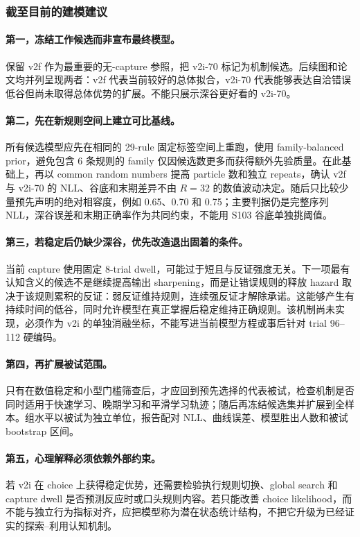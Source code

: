 \subsubsection{截至目前的建模建议}

\paragraph{第一，冻结工作候选而非宣布最终模型。}
保留 v2f 作为最重要的无-capture 参照，把 v2i-70 标记为机制候选。后续图和论文均并列呈现两者：v2f 代表当前较好的总体拟合，v2i-70 代表能够表达自洽错误低谷但尚未取得总体优势的扩展。不能只展示深谷更好看的 v2i-70。

\paragraph{第二，先在新规则空间上建立可比基线。}
所有候选模型应先在相同的 29-rule 固定标签空间上重跑，使用 family-balanced prior，避免包含 6 条规则的 family 仅因候选数更多而获得额外先验质量。在此基础上，再以 common random numbers 提高 particle 数和独立 repeats，确认 v2f 与 v2i-70 的 NLL、谷底和末期差异不由 $R=32$ 的数值波动决定。随后只比较少量预先声明的绝对相容度，例如 0.65、0.70 和 0.75；主要判据仍是完整序列 NLL，深谷误差和末期正确率作为共同约束，不能用 S103 谷底单独挑阈值。

\paragraph{第三，若稳定后仍缺少深谷，优先改造退出固着的条件。}
当前 capture 使用固定 8-trial dwell，可能过于短且与反证强度无关。下一项最有认知含义的候选不是继续提高输出 sharpening，而是让错误规则的释放 hazard 取决于该规则累积的反证：弱反证维持规则，连续强反证才解除承诺。这能够产生有持续时间的低谷，同时允许模型在真正掌握后稳定维持正确规则。该机制尚未实现，必须作为 v2i 的单独消融坐标，不能写进当前模型方程或事后针对 trial 96--112 硬编码。

\paragraph{第四，再扩展被试范围。}
只有在数值稳定和小型门槛筛查后，才应回到预先选择的代表被试，检查机制是否同时适用于快速学习、晚期学习和平滑学习轨迹；随后再冻结候选集并扩展到全样本。组水平以被试为独立单位，报告配对 NLL、曲线误差、模型胜出人数和被试 bootstrap 区间。

\paragraph{第五，心理解释必须依赖外部约束。}
若 v2i 在 choice 上获得稳定优势，还需要检验执行规则切换、global search 和 capture dwell 是否预测反应时或口头规则内容。若只能改善 choice likelihood，而不能与独立行为指标对齐，应把模型称为潜在状态统计结构，不把它升级为已经证实的探索--利用认知机制。


